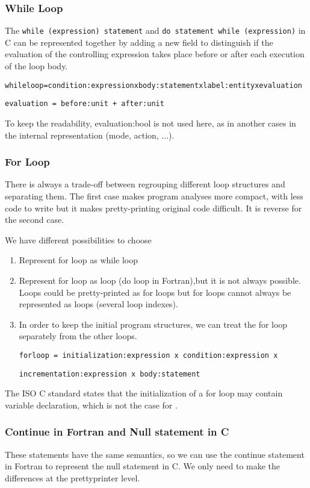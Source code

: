 \documentclass[a4paper]{article}
\begin{document}
\subsubsection{While Loop}
The \verb/while (expression) statement/ and 
\verb/do statement while (expression)/ in C can be represented together
 by adding a new field to distinguish
if the evaluation of the
controlling expression takes place before or after each execution of the
loop body.   

\verb/whileloop=condition:expressionxbody:statementxlabel:entityxevaluation/

\verb/evaluation = before:unit + after:unit/

To keep the readability, evaluation:bool is not used here, as in another
cases in the internal representation (mode, action, ...).

\subsubsection{For Loop}
There is always a trade-off between regrouping different loop structures
and separating them. The first case makes program analyses more compact,
with less code to write but it makes pretty-printing original code
difficult. It is reverse for the second case. 

We have different possibilities to choose
\begin{enumerate}
\item Represent for loop as while loop
\item Represent for loop as loop (do loop in Fortran),but it is not always
  possible. Loops could be pretty-printed as for loops but for loops cannot
  always be represented as loops (several loop indexes).
\item In order to keep the initial program structures, we can treat the for loop
separately from the other loops. 

\verb/forloop = initialization:expression x condition:expression x/

\verb/incrementation:expression x body:statement/
\end{enumerate}

The ISO C standard \cite{ISOC} states that
the initialization of a for loop may contain variable declaration, which
is not the case for \cite{Kern78}. 

\subsubsection{Continue in Fortran and Null statement in C}
These statements have the same semantics, so we can use the continue statement in
Fortran to represent the null statement in C. We only need to make the
differences at the prettyprinter level. 
\end{document}
